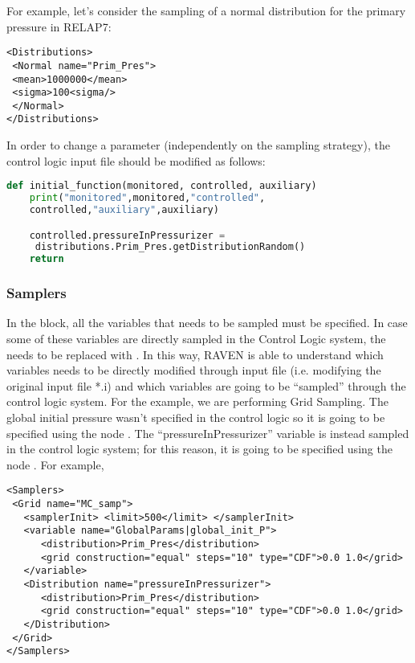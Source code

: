 %
For example, let's consider the sampling of a normal distribution for the primary pressure in
RELAP7:
%
\begin{lstlisting}[style=XML]
<Distributions>
 <Normal name="Prim_Pres">
 <mean>1000000</mean>
 <sigma>100<sigma/>
 </Normal>
</Distributions>
\end{lstlisting}
In order to change a parameter (independently on the sampling strategy), the control logic input file should be modified as follows:
\begin{lstlisting}[language=Python]
def initial_function(monitored, controlled, auxiliary)
    print("monitored",monitored,"controlled",
    controlled,"auxiliary",auxiliary)

    controlled.pressureInPressurizer =
     distributions.Prim_Pres.getDistributionRandom()
    return
\end{lstlisting}

\subsubsection{Samplers}
In the  block, all the variables that needs to be sampled must be specified.
In case some of these variables are directly sampled in the Control Logic system, the
 needs to be replaced with . In this way, RAVEN is able
to understand which variables needs to be directly modified through input file (i.e. modifying the original
input file *.i)  and which variables are going to be ``sampled'' through the control logic system.
%
For the example, we are performing Grid Sampling.
%
The global initial pressure wasn't specified in the control logic so it is going to be specified
using the node . The ``pressureInPressurizer'' variable is instead sampled in the
control logic system; for this reason, it is going to be specified using the node  .
%
For example,
%
\begin{lstlisting}[style=XML]
<Samplers>
 <Grid name="MC_samp">
   <samplerInit> <limit>500</limit> </samplerInit>
   <variable name="GlobalParams|global_init_P">
      <distribution>Prim_Pres</distribution>
      <grid construction="equal" steps="10" type="CDF">0.0 1.0</grid>
   </variable>
   <Distribution name="pressureInPressurizer">
      <distribution>Prim_Pres</distribution>
      <grid construction="equal" steps="10" type="CDF">0.0 1.0</grid>
   </Distribution>
 </Grid>
</Samplers>
\end{lstlisting}



